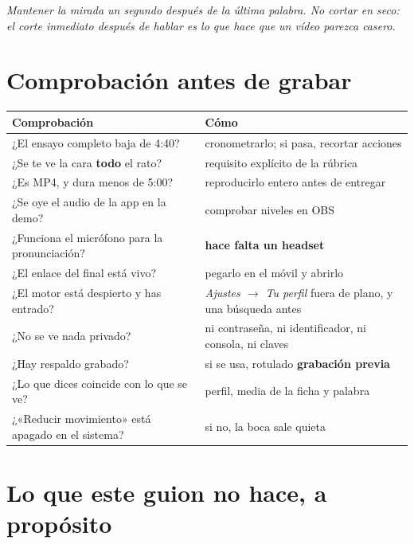 \documentclass[11pt,a4paper]{article}
\begin{document}
\begin{ve}
\emph{Mantener la mirada un segundo después de la última palabra. No cortar en
seco: el corte inmediato después de hablar es lo que hace que un vídeo parezca
casero.}
\end{ve}

\newpage
\section{Comprobación antes de grabar}

\begin{center}
\begin{tabularx}{\textwidth}{@{}>{\raggedright\arraybackslash}X l@{}}
\toprule
\textbf{Comprobación} & \textbf{Cómo} \\
\midrule
¿El ensayo completo baja de 4:40? & cronometrarlo; si pasa, recortar acciones \\
¿Se te ve la cara \textbf{todo} el rato? & requisito explícito de la rúbrica \\
¿Es MP4, y dura menos de 5:00? & reproducirlo entero antes de entregar \\
¿Se oye el audio de la app en la demo? & comprobar niveles en OBS \\
¿Funciona el micrófono para la pronunciación? & \textbf{hace falta un headset} \\
¿El enlace del final está vivo? & pegarlo en el móvil y abrirlo \\
¿El motor está despierto y has entrado? & \emph{Ajustes $\rightarrow$ Tu perfil} fuera de plano, y una búsqueda antes \\
¿No se ve nada privado? & ni contraseña, ni identificador, ni consola, ni claves \\
¿Hay respaldo grabado? & si se usa, rotulado \textbf{grabación previa} \\
¿Lo que dices coincide con lo que se ve? & perfil, media de la ficha y palabra \\
¿«Reducir movimiento» está apagado en el sistema? & si no, la boca sale quieta \\
\bottomrule
\end{tabularx}
\end{center}

\section{Lo que este guion no hace, a propósito}
\end{document}

